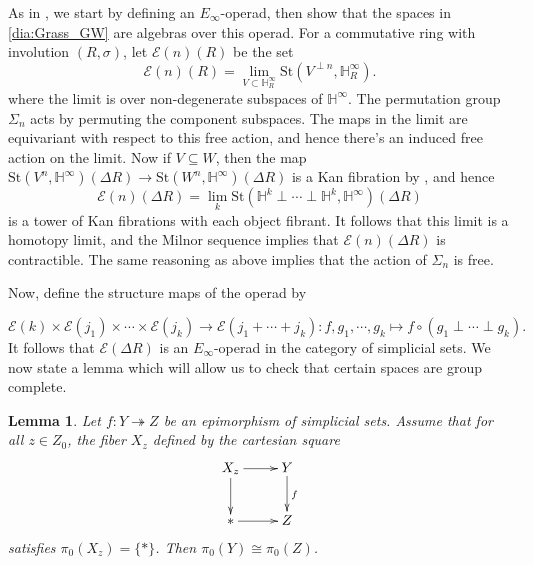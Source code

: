 \documentclass[edeposit,fullpage]{uiucthesis2009}
\newcommand{\mbb}{\mathbb}
\newcommand{\St}{\mathrm{St}}
\theoremstyle{plain}
\newtheorem{lemma}{Lemma}
\numberwithin{lemma}{section}
\theoremstyle{definition}
\begin{document}
As in \cite{SchTri}, we start by defining an $E_\infty$-operad, then
show that the spaces in \ref{dia:Grass_GW} are algebras over this
operad. For a commutative ring with involution $(R,\sigma)$, let $\mathscr
E(n)(R)$ be the set
\[
\mathscr E(n)(R) = \lim_{V \subset \mbb H^\infty_R} \St(V^{\perp n} , \mbb H^\infty_R).
\]
where the limit is over non-degenerate subspaces of $\mbb H^\infty$. The
permutation group $\Sigma_n$ acts by permuting the component
subspaces. The maps in the limit are equivariant with respect to this
free action, and hence there's an induced free action on the
limit. Now if $V \subseteq W$, then the map $\St(V^n,\mbb
H^\infty)(\Delta R) \rightarrow \St(W^n,\mbb H^\infty)(\Delta R)$ is
a Kan fibration by \cite[Proposition A.5]{SchTri}, and hence
\[
\mathscr E(n)(\Delta R) = \lim_k \St(\mbb H^k \perp \cdots \perp \mbb
H^k,\mbb H^\infty)(\Delta R)
\]
is a tower of Kan fibrations with each object fibrant. It follows that
this limit is a homotopy limit, and the Milnor sequence implies that
$\mathscr E(n)(\Delta R)$ is contractible. The same reasoning as above
implies that the action of $\Sigma_n$ is free. 

Now, define the structure maps of the operad by

\[
\mathscr E(k) \times \mathscr E(j_1) \times \cdots \times \mathscr
E(j_k) \rightarrow \mathscr E(j_1 + \cdots + j_k) : f,g_1,\cdots,g_k
\mapsto f \circ (g_1 \perp \cdots \perp g_k).
\]
It follows that $\mathscr E(\Delta R)$ is an $E_\infty$-operad in the
category of simplicial sets. We now state a lemma which will allow us to check that certain spaces
are group complete.

\begin{lemma}\label{lem:grp_complete_help}
Let $f: Y \twoheadrightarrow Z$ be an epimorphism of simplicial
sets. Assume that for all $z \in Z_0$, the fiber $X_z$ defined by the
cartesian square
\[
\xymatrix{X_z \ar[r] \ar[d]& Y \ar[d]^f \\ \ast \ar[r] & Z}
\]
satisfies $\pi_0(X_z) = \{\ast\}$. Then $\pi_0(Y) \cong \pi_0(Z)$.
\end{lemma}
\end{document}
